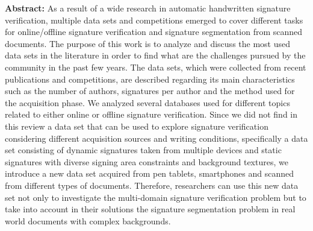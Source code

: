\begin{apendicesenv}
\textbf{Abstract:} As a result of a wide research in automatic handwritten signature verification, multiple data sets and competitions emerged to cover different tasks for online/offline signature verification and signature segmentation from scanned documents. The purpose of this work is to analyze and discuss the most used data sets in the literature in order to find what are the challenges pursued by the community in the past few years. The data sets, which were collected from recent publications and competitions, are described regarding its main characteristics such as the number of authors, signatures per author and the method used for the acquisition phase. We analyzed several databases used for different topics related to either online or offline signature verification. Since we did not find in this review a data set that can be used to explore signature verification considering different acquisition sources and writing conditions, specifically a data set consisting of dynamic signatures taken from multiple devices and static signatures with diverse signing area constraints and background textures, we introduce a new data set acquired from pen tablets, smartphones and scanned from different types of documents. Therefore, researchers can use this new data set not only to investigate the multi-domain signature verification problem but to take into account in their solutions the signature segmentation problem in real world documents with complex backgrounds.

\hspace{0.6in}



\end{apendicesenv}
